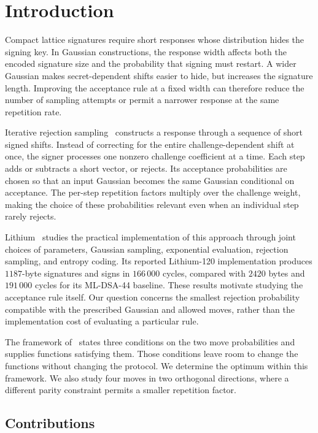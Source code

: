 \section{Introduction}
\label{sec:intro}

Compact lattice signatures require short responses whose distribution hides the signing key. In Gaussian constructions, the response width affects both the encoded signature size and the probability that signing must restart. A wider Gaussian makes secret-dependent shifts easier to hide, but increases the signature length. Improving the acceptance rule at a fixed width can therefore reduce the number of sampling attempts or permit a narrower response at the same repetition rate.

Iterative rejection sampling~\cite{GartnerFull} constructs a response through a sequence of short signed shifts. Instead of correcting for the entire challenge-dependent shift at once, the signer processes one nonzero challenge coefficient at a time. Each step adds or subtracts a short vector, or rejects. Its acceptance probabilities are chosen so that an input Gaussian becomes the same Gaussian conditional on acceptance. The per-step repetition factors multiply over the challenge weight, making the choice of these probabilities relevant even when an individual step rarely rejects.

Lithium~\cite{cryptoeprint:2026/1790} studies the practical implementation of this approach through joint choices of parameters, Gaussian sampling, exponential evaluation, rejection sampling, and entropy coding. Its reported Lithium-120 implementation produces $1187$-byte signatures and signs in $166\,000$ cycles, compared with $2420$ bytes and $191\,000$ cycles for its ML-DSA-44 baseline. These results motivate studying the acceptance rule itself. Our question concerns the smallest rejection probability compatible with the prescribed Gaussian and allowed moves, rather than the implementation cost of evaluating a particular rule.

The framework of~\cite{GartnerFull} states three conditions on the two move probabilities and supplies functions satisfying them. Those conditions leave room to change the functions without changing the protocol. We determine the optimum within this framework. We also study four moves in two orthogonal directions, where a different parity constraint permits a smaller repetition factor.

\subsection{Contributions}


